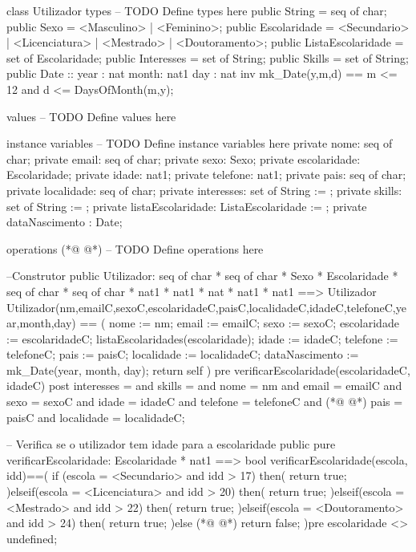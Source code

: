 \begin{vdmpp}[breaklines=true]
class Utilizador
types
-- TODO Define types here
 public String = seq of char;
 public Sexo = <Masculino> | <Feminino>;
 public Escolaridade = <Secundario> | <Licenciatura> | <Mestrado> | <Doutoramento>;
 public ListaEscolaridade = set of Escolaridade;
 public Interesses = set of String;
 public Skills = set of String;
 public Date :: year : nat month: nat1 day : nat 
  inv mk_Date(y,m,d) == m <= 12 and d <= DaysOfMonth(m,y);
 
values
-- TODO Define values here

instance variables
-- TODO Define instance variables here
 private nome: seq of char;
 private email: seq of char;
 private sexo: Sexo;
 private escolaridade: Escolaridade;
 private idade: nat1;
 private telefone: nat1;
 private pais: seq of char;
 private localidade: seq of char;
 private interesses: set of String := {};
 private skills: set of String := {};
 private listaEscolaridade: ListaEscolaridade := {};
 private dataNascimento : Date;
 
operations
(*@
\label{Utilizador:32}
@*)
-- TODO Define operations here

 --Construtor
 public Utilizador: seq of char * seq of char * Sexo * Escolaridade * seq of char * seq of char * nat1 * nat1 * nat * nat1 * nat1 ==> Utilizador
 Utilizador(nm,emailC,sexoC,escolaridadeC,paisC,localidadeC,idadeC,telefoneC,year,month,day) == (
  nome := nm;
  email := emailC;
  sexo := sexoC;
  escolaridade := escolaridadeC;
  listaEscolaridades(escolaridade);
  idade := idadeC;
  telefone := telefoneC;
  pais := paisC;
  localidade := localidadeC;
  dataNascimento := mk_Date(year, month, day);
  return self
 )
 pre verificarEscolaridade(escolaridadeC, idadeC)
 post interesses = {} and
   skills = {} and
   nome = nm and
   email = emailC and
   sexo = sexoC and
   idade = idadeC and
   telefone = telefoneC and
(*@
\label{verificarEscolaridade:57}
@*)
   pais = paisC and
   localidade = localidadeC;
 
 -- Verifica se o utilizador tem idade para a escolaridade
 public pure verificarEscolaridade: Escolaridade * nat1 ==> bool
 verificarEscolaridade(escola, idd)==(
 if (escola = <Secundario> and idd > 17) then(
  return true;
 )elseif(escola = <Licenciatura> and idd > 20) then(
  return true;
 )elseif(escola = <Mestrado> and idd > 22) then(
  return true;
 )elseif(escola = <Doutoramento> and idd > 24) then(
  return true;
 )else
(*@
\label{listaEscolaridades:72}
@*)
  return false;
 )pre escolaridade <> undefined;
 

\end{vdmpp}
